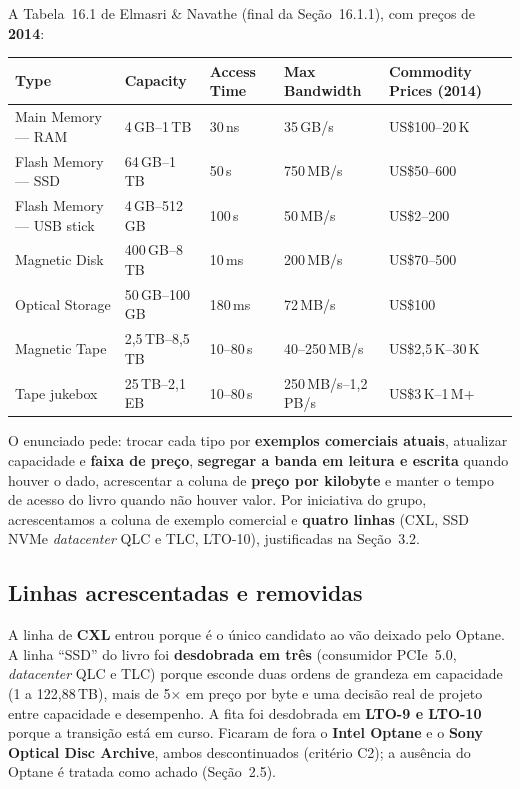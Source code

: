 \documentclass[11pt,a4paper]{article}
\newcommand{\us}{\,\textmu s}
\begin{document}
A Tabela~16.1 de Elmasri \& Navathe (final da Seção~16.1.1), com preços de \textbf{2014}:

\begin{center}\footnotesize
\setlength{\tabcolsep}{3pt}
\begin{tabular}{@{}lllll@{}}
\toprule
\textbf{Type} & \textbf{Capacity} & \textbf{Access Time} & \textbf{Max Bandwidth} & \textbf{Commodity Prices (2014)} \\
\midrule
Main Memory --- RAM        & 4\,GB--1\,TB      & 30\,ns     & 35\,GB/s                & US\$100--20\,K \\
Flash Memory --- SSD       & 64\,GB--1\,TB     & 50\us & 750\,MB/s            & US\$50--600 \\
Flash Memory --- USB stick & 4\,GB--512\,GB    & 100\us & 50\,MB/s            & US\$2--200 \\
Magnetic Disk              & 400\,GB--8\,TB    & 10\,ms     & 200\,MB/s               & US\$70--500 \\
Optical Storage            & 50\,GB--100\,GB   & 180\,ms    & 72\,MB/s                & US\$100 \\
Magnetic Tape              & 2,5\,TB--8,5\,TB  & 10--80\,s  & 40--250\,MB/s           & US\$2,5\,K--30\,K \\
Tape jukebox               & 25\,TB--2,1\,EB   & 10--80\,s  & 250\,MB/s--1,2\,PB/s    & US\$3\,K--1\,M+ \\
\bottomrule
\end{tabular}
\end{center}

O enunciado pede: trocar cada tipo por \textbf{exemplos comerciais atuais}, atualizar
capacidade e \textbf{faixa de preço}, \textbf{segregar a banda em leitura e escrita} quando
houver o dado, acrescentar a coluna de \textbf{preço por kilobyte} e manter o tempo de acesso
do livro quando não houver valor. Por iniciativa do grupo, acrescentamos a coluna de exemplo
comercial e \textbf{quatro linhas} (CXL, SSD NVMe \emph{datacenter} QLC e TLC, LTO-10),
justificadas na Seção~3.2.

\subsection{Linhas acrescentadas e removidas}

A linha de \textbf{CXL} entrou porque é o único candidato ao vão deixado pelo Optane. A linha
``SSD'' do livro foi \textbf{desdobrada em três} (consumidor PCIe~5.0, \emph{datacenter} QLC
e TLC) porque esconde duas ordens de grandeza em capacidade (1 a 122,88\,TB), mais de
5$\times$ em preço por byte e uma decisão real de projeto entre capacidade e desempenho. A
fita foi desdobrada em \textbf{LTO-9 e LTO-10} porque a transição está em curso. Ficaram de
fora o \textbf{Intel Optane} e o \textbf{Sony Optical Disc Archive}, ambos descontinuados
(critério C2); a ausência do Optane é tratada como achado (Seção~2.5).
\end{document}
